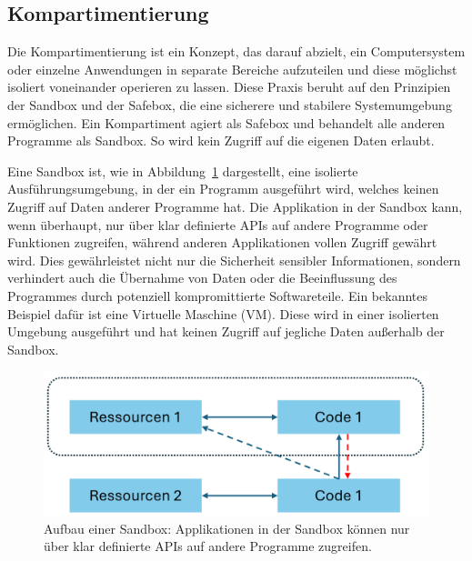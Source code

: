 \subsection{Kompartimentierung}

Die Kompartimentierung ist ein Konzept, das darauf abzielt, ein Computersystem oder einzelne Anwendungen in separate Bereiche aufzuteilen und diese möglichst isoliert voneinander operieren zu lassen. Diese Praxis beruht auf den Prinzipien der Sandbox und der Safebox, die eine sicherere und stabilere Systemumgebung ermöglichen. Ein Kompartiment agiert als Safebox und behandelt alle anderen Programme als Sandbox. So wird kein Zugriff auf die eigenen Daten erlaubt.

Eine Sandbox ist, wie in Abbildung~\ref{fig:Sandbox} dargestellt, eine isolierte Ausführungsumgebung, in der ein Programm ausgeführt wird, welches keinen Zugriff auf Daten anderer Programme hat. Die Applikation in der Sandbox kann, wenn überhaupt, nur über klar definierte APIs auf andere Programme oder Funktionen zugreifen, während anderen Applikationen vollen Zugriff gewährt wird.
Dies gewährleistet nicht nur die Sicherheit sensibler Informationen, sondern verhindert auch die Übernahme von Daten oder die Beeinflussung des Programmes durch potenziell kompromittierte Softwareteile. 
Ein bekanntes Beispiel dafür ist eine Virtuelle Maschine (VM). Diese wird in einer isolierten Umgebung ausgeführt und hat keinen Zugriff auf jegliche Daten außerhalb der Sandbox.

\begin{figure}[h]
    \centering
    \includegraphics[width=0.67\linewidth]{Grafiken/Sandbox.png}
    \caption{Aufbau einer Sandbox: Applikationen in der Sandbox können nur über klar definierte APIs auf andere Programme zugreifen.}
    \label{fig:Sandbox}
\end{figure}

